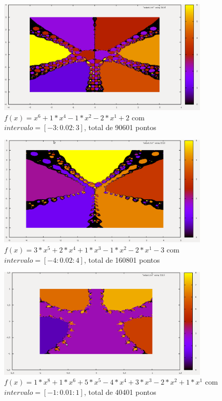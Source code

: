   \begin{figure}[htp]
    \centering
    \includegraphics[width=0.9\textwidth]{imgs/img3.png}
    \caption{$f(x) = x^6 + 1*x^4 - 1*x^2 - 2*x^1 + 2$ com $intervalo = [-3: 0.02: 3]$, total de 90601 pontos}
  \end{figure}

  \begin{figure}[htp]
    \centering
    \includegraphics[width=0.9\textwidth]{imgs/img4.png}
    \caption{$f(x) = 3*x^5 + 2*x^4 + 1*x^3 - 1*x^2 - 2*x^1 - 3$ com $intervalo = [-4: 0.02: 4]$, total de 160801 pontos}
  \end{figure}

  \begin{figure}[htp]
    \centering
    \includegraphics[width=0.9\textwidth]{imgs/img5.png}
    \caption{$f(x) = 1*x^8 + 1*x^6 + 5*x^5 - 4*x^4 + 3*x^3 - 2*x^2 + 1*x^1$ com $intervalo = [-1: 0.01: 1]$, total de 40401 pontos}
  \end{figure}

